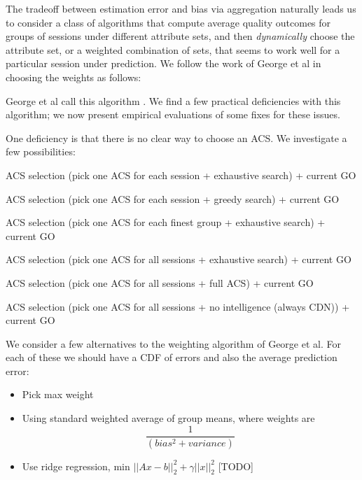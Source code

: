 \label{prediction}
The tradeoff between estimation error and bias via aggregation naturally leads us to consider a class of algorithms that compute average quality outcomes for groups of sessions under different attribute sets, and then {\it dynamically} choose the attribute set, or a weighted combination of sets, that seems to work well for a particular session under prediction.  We follow the work of George et al \cite{george2008value} in choosing the weights as follows: \fillme

George et al call this algorithm \fillme.  We find a few practical deficiencies with this algorithm; we now present empirical evaluations of some fixes for these issues.


One deficiency is that there is no clear way to choose an ACS.  We investigate a few possibilities:
\begin{packedenumerate}
  \item ACS selection (pick one ACS for each session + exhaustive search) + current GO
  \item ACS selection (pick one ACS for each session + greedy search) + current GO
  \item ACS selection (pick one ACS for each finest group + exhaustive search) + current GO
  \item ACS selection (pick one ACS for all sessions + exhaustive search) + current GO
  \item ACS selection (pick one ACS for all sessions + full ACS) + current GO
  \item ACS selection (pick one ACS for all sessions + no intelligence (always CDN)) + current GO
\end{packedenumerate}
\fillme


We consider a few alternatives to the weighting algorithm of George et al.  For each of these we should have a CDF of errors and also the average prediction error:
\begin{itemize}
  \item Pick max weight
	\item Using standard weighted average of group means, where weights are $$\frac{1}{(bias^2 + variance)}$$
	\item Use ridge regression, min $||Ax - b||_2^2 + \gamma||x||_2^2$ [TODO]
\end{itemize}


